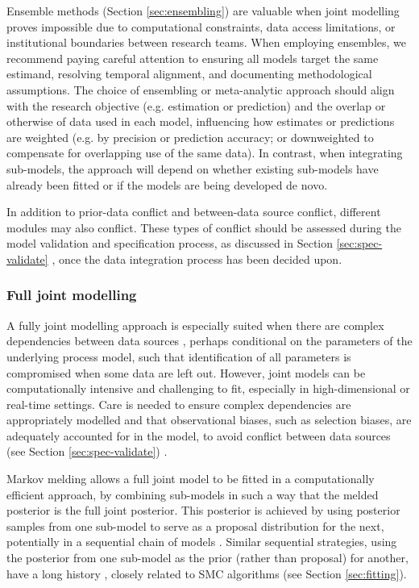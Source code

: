 \documentclass{article}
\begin{document}
Ensemble methods (Section \ref{sec:ensembling}) are valuable when joint modelling proves impossible due to computational constraints, data access limitations, or institutional boundaries between research teams.
When employing ensembles, we recommend paying careful attention to ensuring all models target the same estimand, resolving temporal alignment, and documenting methodological assumptions. The choice of ensembling or meta-analytic approach should align with the research objective (e.g. estimation or prediction) and the overlap or otherwise of data used in each model, influencing how estimates or predictions are weighted (e.g. by precision or prediction accuracy; or downweighted to compensate for overlapping use of the same data). In contrast, when integrating sub-models, the approach will depend on whether existing sub-models have already been fitted or if the models are being developed de novo.

In addition to prior-data conflict and between-data source conflict, different modules may also conflict. These types of conflict should be assessed during the model validation and specification process, as discussed in Section \ref{sec:spec-validate} \citep{presanis2013conflict,sherratt2021exploring,yang2025detecting}, once the data integration process has been decided upon.

\subsubsection{Full joint modelling}\label{sec:joint}

A fully joint modelling approach is especially suited when there are complex dependencies between data sources \citep{corbella2022inferring}, perhaps conditional on the parameters of the underlying process model, such that identification of all parameters is compromised when some data are left out. However, joint models can be computationally intensive and challenging to fit, especially in high-dimensional or real-time settings. Care is needed to ensure complex dependencies are appropriately modelled and that observational biases, such as selection biases, are adequately accounted for in the model, to avoid conflict between data sources (see
Section \ref{sec:spec-validate}) \citep{presanis2013conflict,corbella2022inferring}. 

Markov melding \citep{goudie2019joining} allows a full joint model to be fitted in a computationally efficient approach, by combining sub-models in such a way that the melded posterior is the full joint posterior. This posterior is achieved by using posterior samples from one sub-model to serve as a proposal distribution for the next, potentially in a sequential chain of models \citep{manderson2023combining}. Similar sequential strategies, using the posterior from one sub-model as the prior (rather than proposal) for another, have a long history \citep{west1997bayesian}, closely related to \ac{SMC} algorithms \citep{doucet2001introduction} (see Section \ref{sec:fitting}).
\end{document}
